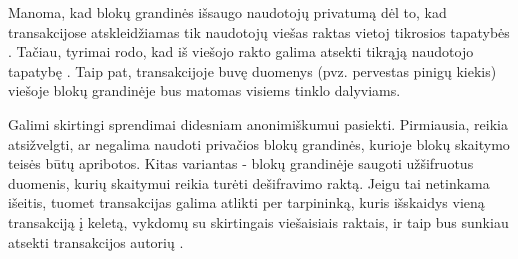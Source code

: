 Manoma, kad blokų grandinės išsaugo naudotojų privatumą dėl to, kad transakcijose atskleidžiamas tik naudotojų
viešas raktas vietoj tikrosios tapatybės \cite{Zheng2017}. Tačiau, tyrimai rodo, kad iš viešojo rakto galima
atsekti tikrąją naudotojo tapatybę \cite{Barcelo2007}. Taip pat, transakcijoje buvę duomenys (pvz. pervestas pinigų kiekis)
viešoje blokų grandinėje bus matomas visiems tinklo dalyviams.

Galimi skirtingi sprendimai didesniam anonimiškumui pasiekti. Pirmiausia, reikia atsižvelgti, ar negalima naudoti privačios blokų grandinės, kurioje
blokų skaitymo teisės būtų apribotos. Kitas variantas - blokų grandinėje saugoti užšifruotus duomenis, kurių skaitymui
reikia turėti dešifravimo raktą. Jeigu tai netinkama išeitis, tuomet transakcijas galima atlikti per tarpininką, kuris išskaidys vieną transakciją
į keletą, vykdomų su skirtingais viešaisiais raktais, ir taip bus sunkiau atsekti transakcijos autorių \cite{Zheng2017}.


